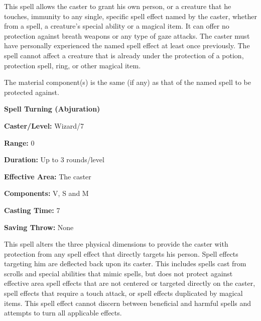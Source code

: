 \begin{multicols}{2}
\begin{minipage}{\columnwidth}
\end{minipage}

This spell allows the caster to grant his own person, or a creature that he touches, immunity to any single, specific spell effect named by the caster, whether from a spell, a creature's special ability or a magical item.  It can offer no protection against breath weapons or any type of gaze attacks.  The caster must have personally experienced the named spell effect at least once previously.  The spell cannot affect a creature that is already under the protection of a potion, protection spell, ring, or other magical item.  

The material component(s) is the same (if any) as that of the named spell to be protected against.

\vspace{1em}

\noindent
\begin{minipage}{\columnwidth}

\noindent \textbf{Spell Turning (Abjuration)}

\noindent \textbf{Caster/Level:} Wizard/7

\noindent \textbf{Range:} 0

\noindent \textbf{Duration:} Up to 3 rounds/level

\noindent \textbf{Effective Area:} The caster

\noindent \textbf{Components:} V, S and M

\noindent \textbf{Casting Time:} 7

\noindent \textbf{Saving Throw:} None

\end{minipage}

This spell alters the three physical dimensions to provide the caster with protection from any spell effect that directly targets his person.  Spell effects targeting him are deflected back upon its caster.  This includes spells cast from scrolls and special abilities that mimic spells, but does not protect against effective area spell effects that are not centered or targeted directly on the caster, spell effects that require a touch attack, or spell effects duplicated by magical items.  This spell effect cannot discern between beneficial and harmful spells and attempts to turn all applicable effects. 


\end{multicols}
